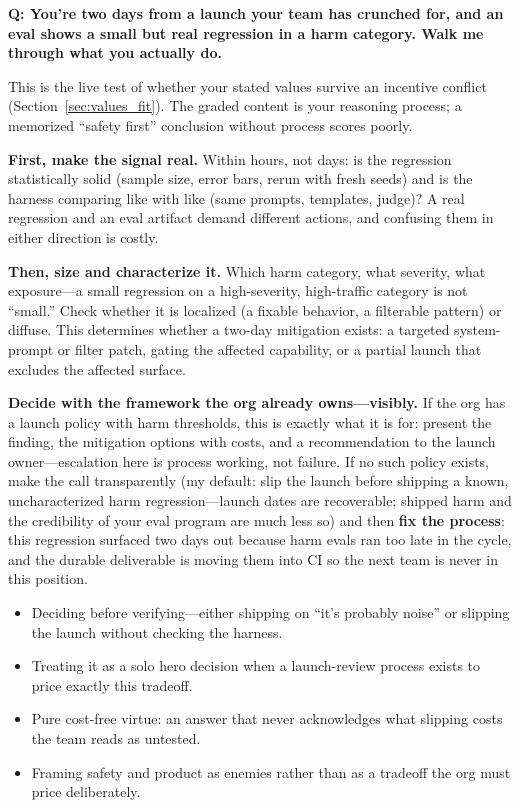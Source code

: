 \begin{interviewq}
\textbf{Q: You're two days from a launch your team has crunched for, and an eval shows a small but real regression in a harm category. Walk me through what you actually do.}

 \quad {} \quad \badgefreq{\freqmed}

\stronganswer

This is the live test of whether your stated values survive an incentive conflict (Section~\ref{sec:values_fit}). The graded content is your reasoning process; a memorized ``safety first'' conclusion without process scores poorly.

\textbf{First, make the signal real.} Within hours, not days: is the regression statistically solid (sample size, error bars, rerun with fresh seeds) and is the harness comparing like with like (same prompts, templates, judge)? A real regression and an eval artifact demand different actions, and confusing them in either direction is costly.

\textbf{Then, size and characterize it.} Which harm category, what severity, what exposure---a small regression on a high-severity, high-traffic category is not ``small.'' Check whether it is localized (a fixable behavior, a filterable pattern) or diffuse. This determines whether a two-day mitigation exists: a targeted system-prompt or filter patch, gating the affected capability, or a partial launch that excludes the affected surface.

\textbf{Decide with the framework the org already owns---visibly.} If the org has a launch policy with harm thresholds, this is exactly what it is for: present the finding, the mitigation options with costs, and a recommendation to the launch owner---escalation here is process working, not failure. If no such policy exists, make the call transparently (my default: slip the launch before shipping a known, uncharacterized harm regression---launch dates are recoverable; shipped harm and the credibility of your eval program are much less so) and then \textbf{fix the process}: this regression surfaced two days out because harm evals ran too late in the cycle, and the durable deliverable is moving them into CI so the next team is never in this position.

\redflags
\begin{itemize}
    \item Deciding before verifying---either shipping on ``it's probably noise'' or slipping the launch without checking the harness.
    \item Treating it as a solo hero decision when a launch-review process exists to price exactly this tradeoff.
    \item Pure cost-free virtue: an answer that never acknowledges what slipping costs the team reads as untested.
    \item Framing safety and product as enemies rather than as a tradeoff the org must price deliberately.
\end{itemize}


\end{interviewq}
